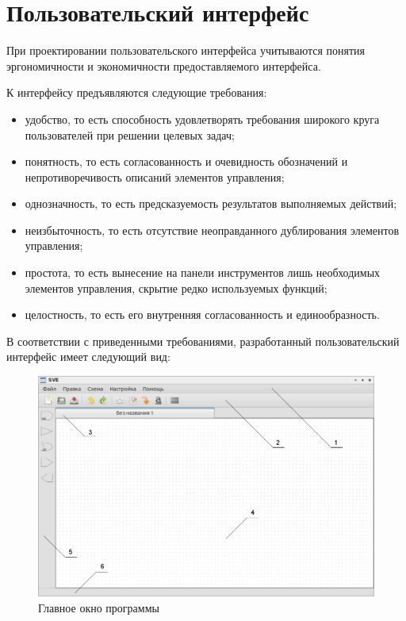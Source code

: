 \section{Пользовательский интерфейс} \label{sec:ui}
При проектировании пользовательского интерфейса учитываются понятия эргономичности и экономичности предоставляемого интерфейса.

К интерфейсу предъявляются следующие требования:
\begin{itemize}
  \item удобство, то есть способность удовлетворять требования широкого круга пользователей при решении целевых задач;
  \item понятность, то есть согласованность и очевидность обозначений и непротиворечивость описаний элементов управления;
  \item однозначность, то есть предсказуемость результатов выполняемых действий;
  \item неизбыточность, то есть отсутствие неоправданного дублирования элементов управления;
  \item простота, то есть вынесение на панели инструментов лишь необходимых элементов управления, скрытие редко используемых функций;
  \item целостность, то есть его внутренняя согласованность и единообразность.
\end{itemize}

В соответствии с приведенными требованиями, разработанный пользовательский интерфейс имеет следующий вид:
\begin{figure}[H]
  \centering
  \includegraphics[width=\textwidth]{gui/main-window.png}
  \caption{Главное окно программы}
  \label{fig:main-window}
\end{figure}

